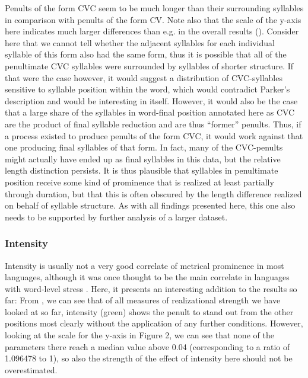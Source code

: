 \documentclass[output=paper]{LSP/langsci}
\begin{document}
Penults of the form CVC seem to be much longer than their surrounding syllables in comparison with penults of the form CV. Note also that the scale of the y-axis here indicates much larger differences than e.g. in the overall results (). Consider here that we cannot tell whether the adjacent syllables for each individual syllable of this form also had the same form, thus it is possible that all of the penultimate CVC syllables were surrounded by syllables of shorter structure. If that were the case however, it would suggest a distribution of CVC-syllables sensitive to syllable position within the word, which would contradict Parker’s description and would be interesting in itself. However, it would also be the case that a large share of the syllables in word-final position annotated here as CVC are the product of final syllable reduction and are thus “former” penults. Thus, if a process existed to produce penults of the form CVC, it would work against that one producing final syllables of that form. In fact, many of the CVC-penults might actually have ended up as final syllables in this data, but the relative length distinction persists. It is thus plausible that syllables in penultimate position receive some kind of prominence that is realized at least partially through duration, but that this is often obscured by the length difference realized on behalf of syllable structure. As with all findings presented here, this one also needs to be supported by further analysis of a larger dataset.   

\largerpage
\subsubsection{Intensity} 
Intensity is usually not a very good correlate of metrical prominence in most languages, although it was once thought to be the main correlate in languages with word-level stress \citep{Beckman1986}. Here, it presents an interesting addition to the results so far: From , we can see that of all measures of realizational strength we have looked at so far, intensity (green) shows the penult to stand out from the other positions most clearly without the application of any further conditions. However, looking at the scale for the y-axis in Figure 2, we can see that none of the parameters there reach a median value above 0.04 (corresponding to a ratio of 1.096478 to 1), so also the strength of the effect of intensity here should not be overestimated.

\end{document}
